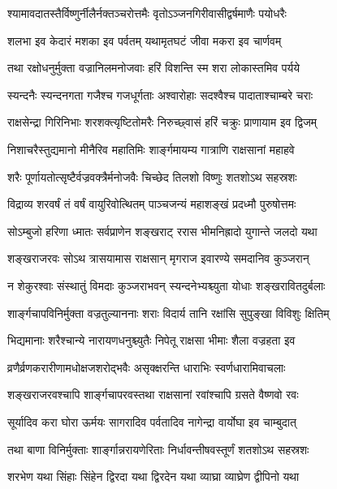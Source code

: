 \twolineshloka
{श्यामावदातस्तैर्विष्णुर्नीलैर्नक्तञ्चरोत्तमैः}
{वृतोऽञ्जनगिरीवासीद्वर्षमाणैः पयोधरैः} %

\twolineshloka
{शलभा इव केदारं मशका इव पर्वतम्}
{यथामृतघटं जीवा मकरा इव चार्णवम्} %

\twolineshloka
{तथा रक्षोधनुर्मुक्ता वज्रानिलमनोजवाः}
{हरिं विशन्ति स्म शरा लोकास्तमिव पर्यये} %

\twolineshloka
{स्यन्दनैः स्यन्दनगता गजैश्च गजधूर्गताः}
{अश्वारोहाः सदश्वैश्च पादाताश्चाम्बरे चराः} %

\twolineshloka
{राक्षसेन्द्रा गिरिनिभाः शरशक्त्यृष्टितोमरैः}
{निरुच्छ्वासं हरिं चक्रुः प्राणायाम इव द्विजम्} %

\twolineshloka
{निशाचरैस्तुद्यमानो मीनैरिव महातिमिः}
{शार्ङ्गमायम्य गात्राणि राक्षसानां महाहवे} %

\twolineshloka
{शरैः पूर्णायतोत्सृष्टैर्वज्रवक्त्रैर्मनोजवैः}
{चिच्छेद तिलशो विष्णुः शतशोऽथ सहस्रशः} %

\twolineshloka
{विद्राव्य शरवर्षं तं वर्षं वायुरिवोत्थितम्}
{पाञ्चजन्यं महाशङ्खं प्रदध्मौ पुरुषोत्तमः} %

\twolineshloka
{सोऽम्बुजो हरिणा ध्मातः सर्वप्राणेन शङ्खराट्}
{ररास भीमनिह्रादो युगान्ते जलदो यथा} %

\twolineshloka
{शङ्खराजरवः सोऽथ त्रासयामास राक्षसान्}
{मृगराज इवारण्ये समदानिव कुञ्जरान्} %

\twolineshloka
{न शेकुरश्वाः संस्थातुं विमदाः कुञ्जराभवन्}
{स्यन्दनेभ्यश्च्युता योधाः शङ्खरावितदुर्बलाः} %

\twolineshloka
{शार्ङ्गचापविनिर्मुक्ता वज्रतुल्याननाः शराः}
{विदार्य तानि रक्षांसि सुपुङ्खा विविशुः क्षितिम्} %

\twolineshloka
{भिद्यमानाः शरैश्चान्ये नारायणधनुश्च्युतैः}
{निपेतू राक्षसा भीमाः शैला वज्रहता इव} %

\twolineshloka
{व्रणैर्व्रणकरारीणामधोक्षजशरोद्भवैः}
{असृक्क्षरन्ति धाराभिः स्वर्णधारामिवाचलाः} %

\twolineshloka
{शङ्खराजरवश्चापि शार्ङ्गचापरवस्तथा}
{राक्षसानां रवांश्चापि ग्रसते वैष्णवो रवः} %

\twolineshloka
{सूर्यादिव करा घोरा ऊर्मयः सागरादिव}
{पर्वतादिव नागेन्द्रा वार्योघा इव चाम्बुदात्} %

\twolineshloka
{तथा बाणा विनिर्मुक्ताः शार्ङ्गान्नरायणेरिताः}
{निर्धावन्तीषवस्तूर्णं शतशोऽथ सहस्रशः} %

\twolineshloka
{शरभेण यथा सिंहाः सिंहेन द्विरदा यथा}
{द्विरदेन यथा व्याघ्रा व्याघ्रेण द्वीपिनो यथा} %

